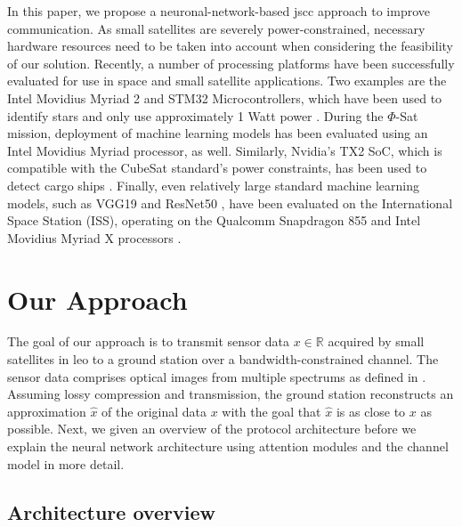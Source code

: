 \documentclass[conference]{IEEEtran}
\begin{document}
In this paper, we propose a neuronal-network-based \ac{jscc} approach to improve communication.
As small satellites are severely power-constrained, necessary hardware resources need to be taken into account when considering the feasibility of our solution.
Recently, a number of processing platforms have been successfully evaluated for use in space and small satellite applications.
Two examples are the Intel Movidius Myriad 2 and STM32 Microcontrollers, which have been used to identify stars and only use approximately 1 Watt power \cite{8556744}.
During the $\Phi$-Sat mission, deployment of machine learning models has been evaluated using an Intel Movidius Myriad processor, as well.
Similarly, Nvidia's TX2 SoC, which is compatible with the CubeSat standard's power constraints, has been used to detect cargo ships \cite{8556744}.
Finally, even relatively large standard machine learning models, such as VGG19 \cite{DBLP:journals/corr/SimonyanZ14a} and ResNet50 \cite{7780459}, have been evaluated on the International Space Station (ISS), operating on the Qualcomm Snapdragon 855 and Intel Movidius Myriad X processors \cite{9884906}.


\section{Our Approach}
\label{sec:our_approach}

The goal of our approach is to transmit sensor data $x \in \mathbb{R}$ acquired by small satellites in \ac{leo} to a ground station over a bandwidth-constrained channel.
The sensor data comprises optical images from multiple spectrums as defined in .
Assuming lossy compression and transmission, the ground station reconstructs an approximation $\hat{x}$ of the original data $x$ with the goal that $\hat{x}$ is as close to $x$ as possible.
Next, we given an overview of the protocol architecture before we explain the neural network architecture using attention modules and the channel model in more detail.

\subsection{Architecture overview}
\end{document}
